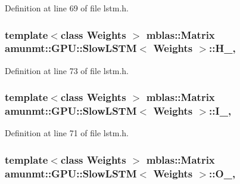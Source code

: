 Definition at line 69 of file lstm.\+h.

\subsubsection[{\texorpdfstring{H\+\_\+}{H_}}]{\setlength{\rightskip}{0pt plus 5cm}template$<$class Weights $>$ {\bf mblas\+::\+Matrix} {\bf amunmt\+::\+G\+P\+U\+::\+Slow\+L\+S\+TM}$<$ {\bf Weights} $>$\+::H\+\_\+\hspace{0.3cm}{\ttfamily [mutable]}, {\ttfamily [private]}}\hypertarget{classamunmt_1_1GPU_1_1SlowLSTM_ad43e82ae91c4f3968ebb44110865d8b6}{}\label{classamunmt_1_1GPU_1_1SlowLSTM_ad43e82ae91c4f3968ebb44110865d8b6}


Definition at line 73 of file lstm.\+h.

\subsubsection[{\texorpdfstring{I\+\_\+}{I_}}]{\setlength{\rightskip}{0pt plus 5cm}template$<$class Weights $>$ {\bf mblas\+::\+Matrix} {\bf amunmt\+::\+G\+P\+U\+::\+Slow\+L\+S\+TM}$<$ {\bf Weights} $>$\+::I\+\_\+\hspace{0.3cm}{\ttfamily [mutable]}, {\ttfamily [private]}}\hypertarget{classamunmt_1_1GPU_1_1SlowLSTM_ab35898fc2b68a55fe0f1e0ab0d88424e}{}\label{classamunmt_1_1GPU_1_1SlowLSTM_ab35898fc2b68a55fe0f1e0ab0d88424e}


Definition at line 71 of file lstm.\+h.

\subsubsection[{\texorpdfstring{O\+\_\+}{O_}}]{\setlength{\rightskip}{0pt plus 5cm}template$<$class Weights $>$ {\bf mblas\+::\+Matrix} {\bf amunmt\+::\+G\+P\+U\+::\+Slow\+L\+S\+TM}$<$ {\bf Weights} $>$\+::O\+\_\+\hspace{0.3cm}{\ttfamily [mutable]}, {\ttfamily [private]}}\hypertarget{classamunmt_1_1GPU_1_1SlowLSTM_a8cfd9b003eef67eccad0d0b65425005e}{}\label{classamunmt_1_1GPU_1_1SlowLSTM_a8cfd9b003eef67eccad0d0b65425005e}


